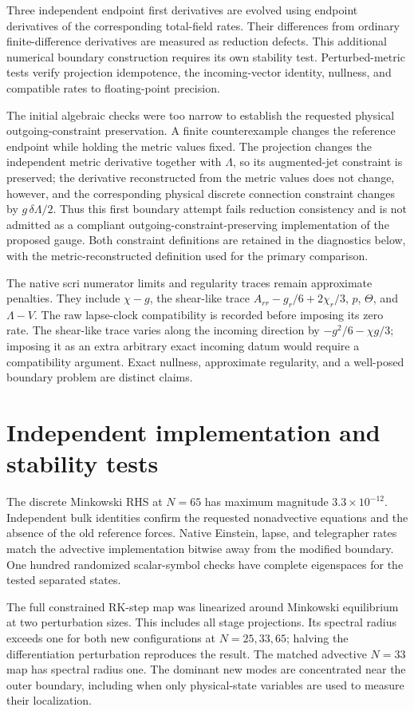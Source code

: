 \documentclass[11pt]{article}
\begin{document}
Three independent endpoint first derivatives are evolved using endpoint derivatives of the corresponding total-field rates. Their differences from ordinary finite-difference derivatives are measured as reduction defects. This additional numerical boundary construction requires its own stability test. Perturbed-metric tests verify projection idempotence, the incoming-vector identity, nullness, and compatible rates to floating-point precision.

The initial algebraic checks were too narrow to establish the requested physical outgoing-constraint preservation. A finite counterexample changes the reference endpoint while holding the metric values fixed. The projection changes the independent metric derivative together with $\Lambda$, so its augmented-jet constraint is preserved; the derivative reconstructed from the metric values does not change, however, and the corresponding physical discrete connection constraint changes by $g\,\delta\Lambda/2$. Thus this first boundary attempt fails reduction consistency and is not admitted as a compliant outgoing-constraint-preserving implementation of the proposed gauge. Both constraint definitions are retained in the diagnostics below, with the metric-reconstructed definition used for the primary comparison.

The native scri numerator limits and regularity traces remain approximate penalties. They include $\chi-g$, the shear-like trace $A_{rr}-g_r/6+2\chi_r/3$, $p$, $\Theta$, and $\Lambda-V$. The raw lapse-clock compatibility is recorded before imposing its zero rate. The shear-like trace varies along the incoming direction by $-g^2/6-\chi g/3$; imposing it as an extra arbitrary exact incoming datum would require a compatibility argument. Exact nullness, approximate regularity, and a well-posed boundary problem are distinct claims.

\section{Independent implementation and stability tests}
The discrete Minkowski RHS at $N=65$ has maximum magnitude $3.3\times10^{-12}$. Independent bulk identities confirm the requested nonadvective equations and the absence of the old reference forces. Native Einstein, lapse, and telegrapher rates match the advective implementation bitwise away from the modified boundary. One hundred randomized scalar-symbol checks have complete eigenspaces for the tested separated states.

The full constrained RK-step map was linearized around Minkowski equilibrium at two perturbation sizes. This includes all stage projections. Its spectral radius exceeds one for both new configurations at $N=25,33,65$; halving the differentiation perturbation reproduces the result. The matched advective $N=33$ map has spectral radius one. The dominant new modes are concentrated near the outer boundary, including when only physical-state variables are used to measure their localization.
\end{document}
